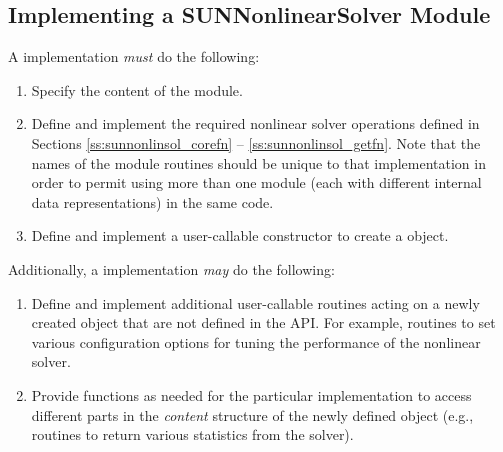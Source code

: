 \subsection{Implementing a SUNNonlinearSolver Module}
\label{ss:sunnonlinsol_custom}

A {\sunnonlinsol} implementation \textit{must} do the following:
\begin{enumerate}
\item Specify the content of the {\sunnonlinsol} module.
\item Define and implement the required nonlinear solver operations
  defined in Sections \ref{ss:sunnonlinsol_corefn}
  -- \ref{ss:sunnonlinsol_getfn}. Note that the names of the module
  routines should be unique to that implementation in order to permit
  using more than one {\sunlinsol} module (each with different
   internal data representations) in
  the same code.
\item Define and implement a user-callable constructor to create a
   object.
\end{enumerate}
Additionally, a {\sunnonlinsol} implementation \textit{may} do the
following:
\begin{enumerate}
\item Define and implement additional user-callable routines acting on
  a newly created  object that are not defined
  in the {\sunnonlinsol} API. For example, routines to set various
  configuration options for tuning the performance of the nonlinear
  solver.
\item Provide functions as needed for the particular {\sunnonlinsol}
  implementation to access different parts in the {\em content}
  structure of the newly defined  object 
  (e.g., routines to return various statistics from the solver).
\end{enumerate}

